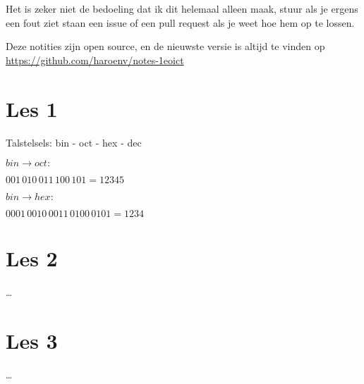 \documentclass[11pt, a4paper]{article}
\begin{document}
Het is zeker niet de bedoeling dat ik dit helemaal alleen maak, stuur als je ergens een fout ziet staan een issue of een pull request als je weet hoe hem op te lossen.

Deze notities zijn open source, en de nieuwste versie is altijd te vinden op \url{https://github.com/haroenv/notes-1eoict}

\section{Les 1}

Talstelsels: bin - oct - hex - dec

$bin \rightarrow oct:$

$001\, 010\, 011\, 100\, 101 = 12345$

$bin \rightarrow hex:$

$0001\, 0010\, 0011\, 0100\, 0101 = 1234$

\section{Les 2}

\dots

\newpage

\section{Les 3}

\dots

\newpage
\end{document}
